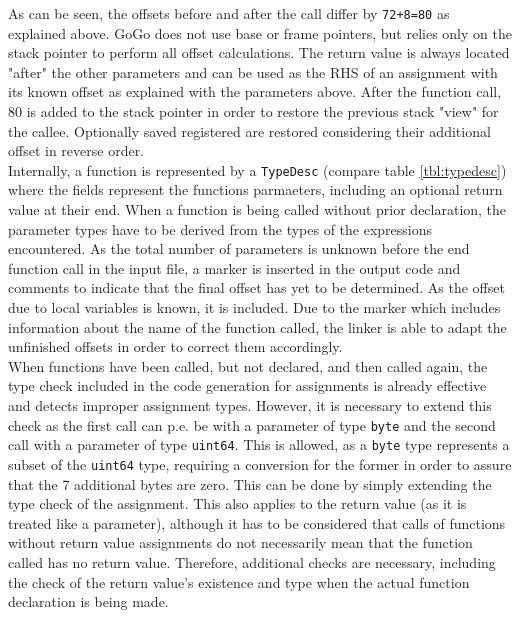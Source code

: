 \documentclass[a4paper]{scrreprt}
\begin{document}
      As can be seen, the offsets before and after the call differ by \texttt{72+8=80} as explained above. GoGo does not use base or frame pointers, but relies only on the stack pointer to perform all offset calculations. The return value is always located "after" the other parameters and can be used as the RHS of an assignment with its known offset as explained with the parameters above. After the function call, 80 is added to the stack pointer in order to restore the previous stack "view" for the callee. Optionally saved registered are restored considering their additional offset in reverse order.\\
      Internally, a function is represented by a \texttt{TypeDesc} (compare table \ref{tbl:typedesc}) where the fields represent the functions parmaeters, including an optional return value at their end. When a function is being called without prior declaration, the parameter types have to be derived from the types of the expressions encountered. As the total number of parameters is unknown before the end function call in the input file, a marker is inserted in the output code and comments to indicate that the final offset has yet to be determined. As the offset due to local variables is known, it is included. Due to the marker which includes information about the name of the function called, the linker is able to adapt the unfinished offsets in order to correct them accordingly.\\
      When functions have been called, but not declared, and then called again, the type check included in the code generation for assignments is already effective and detects improper assignment types. However, it is necessary to extend this check as the first call can p.e. be with a parameter of type \texttt{byte} and the second call with a parameter of type \texttt{uint64}. This is allowed, as a \texttt{byte} type represents a subset of the \texttt{uint64} type, requiring a conversion for the former in order to assure that the 7 additional bytes are zero. This can be done by simply extending the type check of the assignment. This also applies to the return value (as it is treated like a parameter), although it has to be considered that calls of functions without return value assignments do not necessarily mean that the function called has no return value. Therefore, additional checks are necessary, including the check of the return value's existence and type when the actual function declaration is being made.
\end{document}
